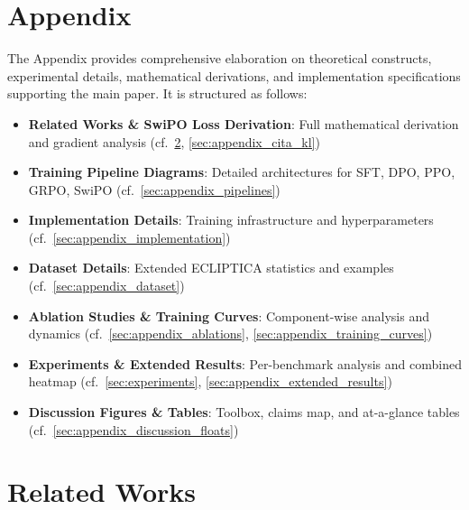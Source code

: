 
\newpage


\section{Appendix}
\label{sec:appendix}

The Appendix provides comprehensive elaboration on theoretical constructs, experimental details, mathematical derivations, and implementation specifications supporting the main paper. It is structured as follows:

\begin{itemize}[leftmargin=*,itemsep=2pt]
    \item \textbf{Related Works \& SwiPO Loss Derivation}: Full mathematical derivation and gradient analysis (cf.~\cref{sec:appendix_related}, \cref{sec:appendix_cita_kl})
    \item \textbf{Training Pipeline Diagrams}: Detailed architectures for SFT, DPO, PPO, GRPO, SwiPO (cf.~\cref{sec:appendix_pipelines})
    \item \textbf{Implementation Details}: Training infrastructure and hyperparameters (cf.~\cref{sec:appendix_implementation})
    \item \textbf{Dataset Details}: Extended ECLIPTICA statistics and examples (cf.~\cref{sec:appendix_dataset})
    \item \textbf{Ablation Studies \& Training Curves}: Component-wise analysis and dynamics (cf.~\cref{sec:appendix_ablations}, \cref{sec:appendix_training_curves})
    \item \textbf{Experiments \& Extended Results}: Per-benchmark analysis and combined heatmap (cf.~\cref{sec:experiments}, \cref{sec:appendix_extended_results})
    \item \textbf{Discussion Figures \& Tables}: Toolbox, claims map, and at-a-glance tables (cf.~\cref{sec:appendix_discussion_floats})
\end{itemize}



\vspace{-3mm}
\section{Related Works}
\label{sec:appendix_related}

